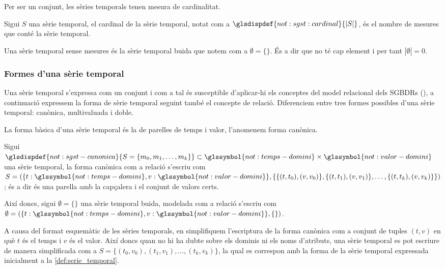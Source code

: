 Per ser un conjunt, les sèries temporals tenen mesura de cardinalitat.
\begin{definition}[Cardinal]
  \label{def:sgst:cardinal}
  Sigui $S$ una sèrie temporal, el cardinal de la sèrie temporal,
  notat com a $\glsdispdef{not:sgst:cardinal}{|S|}$, és el nombre de
  mesures que conté la sèrie temporal.
\end{definition}

Una sèrie temporal sense mesures és la sèrie temporal buida que notem
com a $\emptyset=\{\}$. És a dir que no té cap element i per tant
$|\emptyset|=0$.

 


\subsubsection{Formes d'una sèrie temporal}


Una sèrie temporal s'expressa com un conjunt i com a tal és
susceptible d'aplicar-hi els conceptes del model relacional dels
\glspl{SGBDR} (), a continuació
expressem la forma de sèrie temporal seguint també el concepte de
relació. Diferenciem entre tres formes possibles d'una sèrie temporal:
canònica, multivaluada i doble.  

La forma bàsica d'una sèrie temporal és la de parelles de temps i
valor, l'anomenem forma canònica. 
\begin{definition}
  \label{def:sgst:forma-canonica}
  Sigui $\glsdispdef{not:sgst-canonica}{S = \{ m_0, m_1 , \dotsc, m_k
    \}}\subset \glssymbol{not:temps-domini} \times
  \glssymbol{not:valor-domini}$ una sèrie temporal, la forma canònica
  com a relació s'escriu com $S = ( \{t: \glssymbol{not:temps-domini}, v:
  \glssymbol{not:valor-domini} \}, \{ \{ (t,t_0),(v,v_0)\},
  \{(t,t_1),(v,v_1)\}, \dotsc, \{(t,t_k),(v,v_k)\} \} )$; és a dir és
  una parella amb la capçalera i el conjunt de valors certs.

  Així doncs, sigui $\emptyset=\{ \}$ una sèrie temporal buida,
  modelada com a relació s'escriu com $\emptyset = ( \{t:
  \glssymbol{not:temps-domini}, v: \glssymbol{not:valor-domini} \}, \{ \} )$.
\end{definition}


A causa del format esquemàtic de les sèries temporals, en simplifiquem
l'escriptura de la forma canònica com a conjunt de tuples $(t,v)$ en
què $t$ és el temps i $v$ és el valor. Així doncs quan no hi ha dubte
sobre els dominis ni els noms d'atributs, una sèrie temporal es pot
escriure de manera simplificada com a $S = \{ (t_0,v_0), (t_1,v_1),
\dotsc, (t_k,v_k) \}$, la qual es correspon amb la forma de la sèrie
temporal expressada inicialment a la \autoref{def:serie_temporal}.


